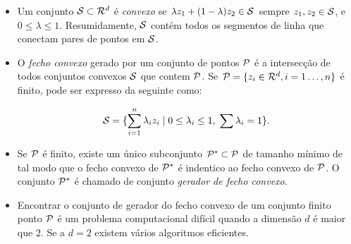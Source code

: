 \documentclass[12pt]{article}
\begin{document}
\begin{itemize}

\item Um conjunto ${\cal S} \subset {\cal R}^d$ é {\em convexo} se $\lambda
z_1 + (1-\lambda)z_2 \in {\cal S}$ sempre $z_1, z_2 \in{\cal S}$,
e $0 \le \lambda \le 1$. Resumidamente, ${\cal S}$ contém todos os segmentos de linha que conectam pares de pontos em ${\cal S}$.

\item O {\em fecho convexo} gerado por um conjunto de pontos ${\cal P}$ é
a intersecção de todos conjuntos convexos ${\cal S}$ que contem ${\cal P}$.
Se ${\cal P} = \{z_i\in{\cal R}^d, i=1\ldots, n\}$ é finito, pode ser expresso da seguinte como:

$${\cal S} = \{ \sum_{i=1}^n \lambda_i z_i \;|\; 0 \le \lambda_i \le
1, \; \sum \lambda_i = 1\}.$$

\begin{center}
\end{center}

\item Se ${\cal P}$ é finito, existe um único subconjunto ${\cal
P}^* \subset {\cal P}$ de tamanho mínimo de tal modo que o fecho convexo de
${\cal P}^*$ é indentico ao fecho convexo de ${\cal P}$.  O conjunto
${\cal P}^*$ é chamado de conjunto {\em gerador de fecho convexo}.

\item Encontrar o conjunto de gerador do fecho convexo de um conjunto finito ponto
${\cal P}$ é um problema computacional difícil quando a dimensão $d$
é maior que $2$.  Se a $d = 2$ existem vários algoritmos eficientes.
\end{itemize}
\end{document}
